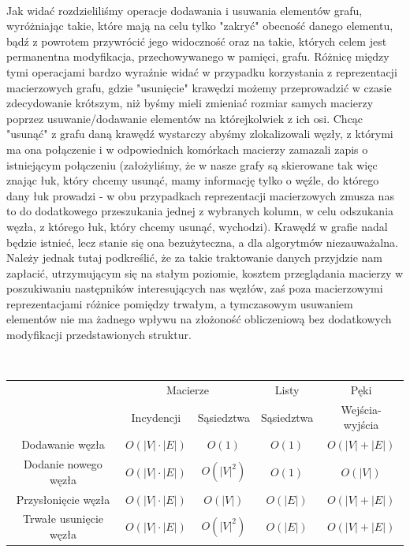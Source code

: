 ~

Jak widać rozdzieliliśmy operacje dodawania i usuwania elementów grafu, wyróżniając takie, które mają na celu tylko "zakryć" obecność danego elementu, bądź z powrotem przywrócić jego widoczność oraz na takie, których celem jest permanentna modyfikacja, przechowywanego w pamięci, grafu. Różnicę między tymi operacjami bardzo wyraźnie widać w przypadku korzystania z reprezentacji macierzowych grafu, gdzie "usunięcie" krawędzi możemy przeprowadzić w czasie zdecydowanie krótszym, niż byśmy mieli zmieniać rozmiar samych macierzy poprzez usuwanie/dodawanie elementów na którejkolwiek z ich osi. Chcąc "usunąć" z grafu daną krawędź wystarczy abyśmy zlokalizowali węzły, z którymi ma ona połączenie i w odpowiednich komórkach macierzy zamazali zapis o istniejącym połączeniu (założyliśmy, że w nasze grafy są skierowane tak więc znając łuk, który chcemy usunąć, mamy informację tylko o węźle, do którego dany łuk prowadzi - w obu przypadkach reprezentacji macierzowych zmusza nas to do dodatkowego przeszukania jednej z wybranych kolumn, w celu odszukania węzła, z którego łuk, który chcemy usunąć, wychodzi). Krawędź w grafie nadal będzie istnieć, lecz stanie się ona bezużyteczna, a dla algorytmów niezauważalna. Należy jednak tutaj podkreślić, że za takie traktowanie danych przyjdzie nam zapłacić, utrzymującym się na stałym poziomie, kosztem przeglądania macierzy w poszukiwaniu następników interesujących nas węzłów, zaś poza macierzowymi reprezentacjami różnice pomiędzy trwałym, a tymczasowym usuwaniem elementów nie ma żadnego wpływu na złożoność obliczeniową bez dodatkowych modyfikacji przedstawionych struktur.

~
\begin{center}
	\begin{tabular}{ccccc}
		\hline
		& \multicolumn{2}{c}{Macierze} & \multicolumn{1}{c}{Listy} & \multicolumn{1}{c}{Pęki} \\
		& Incydencji & Sąsiedztwa & Sąsiedztwa & Wejścia-wyjścia \\
		\hline
		Dodawanie węzła & $ O \left( \left| V \right| \cdot \left| E \right| \right) $ & $ O \left( 1 \right) $ & $O \left( 1 \right) $ & $O \left( \left| V \right| + \left| E \right| \right) $ \\
		Dodanie nowego  węzła & $ O \left( \left| V \right| \cdot \left| E \right| \right) $  & $ O \left( \left| V \right| ^{2} \right)$ & $ O \left( 1 \right)$ & $ O \left( \left| V \right| \right)$ \\
		Przysłonięcie węzła & $ O \left( \left| V \right| \cdot \left| E \right| \right) $  & $ O \left( \left| V \right| \right)$ & $ O \left( \left| E \right| \right)$ & $ O \left( \left| V \right| + \left| E \right| \right)$ \\
		Trwałe usunięcie węzła & $ O \left( \left| V \right| \cdot \left| E \right| \right) $  & $ O \left( \left| V \right| ^{2} \right)$ & $ O \left( \left| E \right| \right)$ & $ O \left( \left| V \right| + \left| E \right| \right)$ \\
	\end{tabular}
\end{center}

